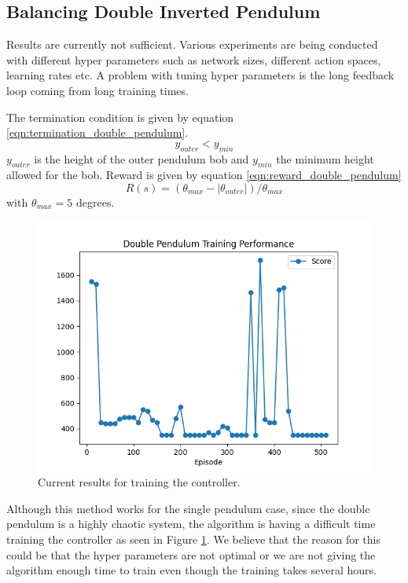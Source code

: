 \documentclass{LTHtwocol} %
\begin{document}

\subsection{Balancing Double Inverted Pendulum}
Results are currently not sufficient.
Various experiments are being conducted with different hyper parameters such as network sizes, different action spaces, learning rates etc.
A problem with tuning hyper parameters is the long feedback loop coming from long training times.

The termination condition is given by equation \eqref{eqn:termination_double_pendulum}.
\begin{equation}
	\label{eqn:termination_double_pendulum}
	y_{outer} < y_{min}
\end{equation}
$y_{outer}$ is the height of the outer pendulum bob and $y_{min}$ the minimum height allowed for the bob.
Reward is given by equation \eqref{eqn:reward_double_pendulum}
\begin{equation}
	\label{eqn:reward_double_pendulum}
	R(s) = (\theta_{max} - |\theta_{outer}|) / \theta_{max}
\end{equation}
with $\theta_{max} = 5$ degrees.

\begin{figure}[H]
	\centering
	\includegraphics[width=0.9\columnwidth]{figures/double_pendulum_eval.png}
	\caption{Current results for training the controller.}
	\label{fig:double_pendulum_score}
\end{figure}
Although this method works for the single pendulum case, since the double pendulum is a highly chaotic system, the algorithm is having a difficult time training the controller as seen in Figure \ref{fig:double_pendulum_score}.
We believe that the reason for this could be that the hyper parameters are not optimal or we are not giving the algorithm enough time to train even though the training takes several hours.
\end{document}
